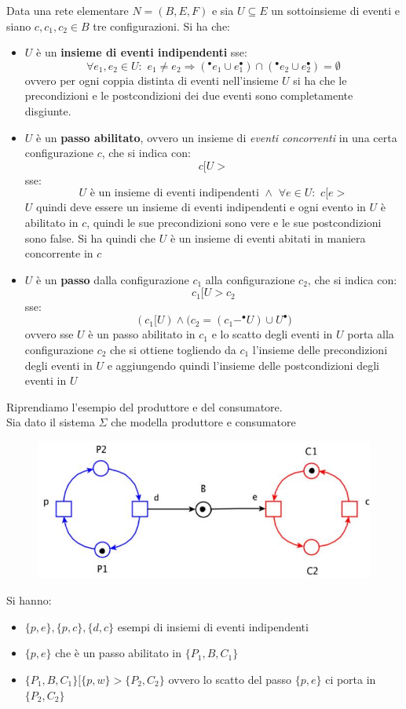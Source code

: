 \documentclass[a4paper,12pt, oneside]{book}
\begin{document}
\begin{definizione}
  Data una rete elementare $N=(B,E,F)$ e sia $U \subseteq E$ un sottoinsieme di
  eventi e siano $c,c_1,c_2\in B$ tre configurazioni. Si ha che:
  \begin{itemize}
    \item $U$ è un \textbf{insieme di eventi indipendenti} sse:
    \[\forall e_1,e_2\in U:\,\,e_1\neq e_2\Rightarrow (^\bullet e_1\cup
      e_1^\bullet)\cap  (^\bullet e_2\cup e_2^\bullet) = \emptyset\]
    ovvero per ogni coppia distinta di eventi nell'insieme $U$ si ha che le
    precondizioni e le postcondizioni dei due eventi sono completamente
    disgiunte.
    \item $U$ è un \textbf{passo abilitato}, ovvero un insieme di \textit{eventi
      concorrenti} in una certa configurazione $c$, che si indica con:
    \[c[U>\]
    sse:
    \[U \mbox{ è un insieme di eventi indipendenti } \wedge\,\, \forall e\in
      U:\,\, c[e>\]
    $U$ quindi deve essere un insieme di eventi indipendenti e ogni evento in
    $U$ è abilitato in $c$, quindi le sue precondizioni sono vere e le sue
    postcondizioni sono false. Si ha quindi che $U$ è un insieme di eventi
    abitati in maniera concorrente in $c$
    \item $U$ è un \textbf{passo} dalla configurazione $c_1$ alla configurazione
    $c_2$, che si indica con:
    \[c_1[U > c_2\]
    sse:
    \[(c_1[U) \wedge \Big(c_2=(c_1-^\bullet U)\cup U^\bullet\Big)\]
    ovvero sse $U$ è un passo abilitato in $c_1$ e lo scatto degli eventi in $U$
    porta alla configurazione $c_2$ che si ottiene togliendo da $c_1$ l'insieme
    delle precondizioni degli eventi in $U$ e aggiungendo quindi l'insieme delle
    postcondizioni degli eventi in $U$
  \end{itemize}
\end{definizione}
\begin{esempio}
  Riprendiamo l'esempio del produttore e del consumatore.\\
  Sia dato il sistema $\Sigma$ che modella produttore e consumatore
  \begin{figure}[H]
    \centering
    \includegraphics[scale = 0.6]{img/prod5.jpg}
  \end{figure}
  Si hanno:
  \begin{itemize}
    \item $\{p,e\},\{p,c\},\{d,c\}$ esempi di insiemi di eventi indipendenti
    \item $\{p,e\}$ che è un passo abilitato in $\{P_1,B,C_1\}$
    \item $\{P_1,B,C_1\}[\{p,w\}>\{P_2,C_2\}$ ovvero lo scatto del passo
    $\{p,e\}$ ci porta in $\{P_2,C_2\}$
  \end{itemize}
\end{esempio}
\end{document}
